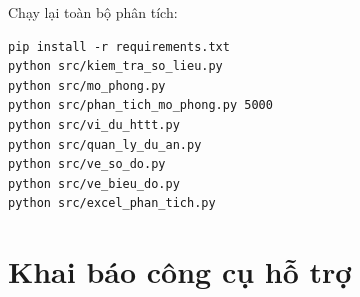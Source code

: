 Chạy lại toàn bộ phân tích:
\begin{verbatim}
pip install -r requirements.txt
python src/kiem_tra_so_lieu.py
python src/mo_phong.py
python src/phan_tich_mo_phong.py 5000
python src/vi_du_httt.py
python src/quan_ly_du_an.py
python src/ve_so_do.py
python src/ve_bieu_do.py
python src/excel_phan_tich.py
\end{verbatim}

\chapter{Khai báo công cụ hỗ trợ}
